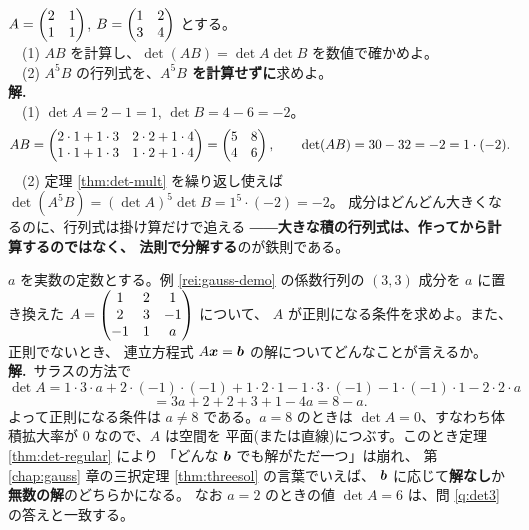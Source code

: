 \begin{rei}[例題・標準(積の法則の活用)]\label{rei:det-mult-ex}
$A = \begin{pmatrix}2 & 1 \\ 1 & 1\end{pmatrix}$, $B = \begin{pmatrix}1 & 2 \\ 3 & 4\end{pmatrix}$ とする。\\
　(1) $AB$ を計算し、$\det(AB) = \det A \det B$ を数値で確かめよ。\\
　(2) $A^5 B$ の行列式を、\textbf{$A^5 B$ を計算せずに}求めよ。\\
\textbf{解.}\\
　(1) $\det A = 2 - 1 = 1$, $\det B = 4 - 6 = -2$。
\[
AB = \begin{pmatrix}2 \cdot 1 + 1 \cdot 3 & 2 \cdot 2 + 1 \cdot 4 \\
1 \cdot 1 + 1 \cdot 3 & 1 \cdot 2 + 1 \cdot 4\end{pmatrix}
= \begin{pmatrix}5 & 8 \\ 4 & 6\end{pmatrix}, \qquad
\det(AB) = 30 - 32 = -2 = 1 \cdot (-2).
\]
　(2) 定理 \ref{thm:det-mult} を繰り返し使えば
$\det(A^5 B) = (\det A)^5 \det B = 1^5 \cdot (-2) = -2$。
成分はどんどん大きくなるのに、行列式は掛け算だけで追える
――\textbf{大きな積の行列式は、作ってから計算するのではなく、
法則で分解する}のが鉄則である。
\end{rei}

\begin{rei}[例題・標準(文字を含む行列)]\label{rei:det-case}
$a$ を実数の定数とする。例 \ref{rei:gauss-demo} の係数行列の
$(3,3)$ 成分を $a$ に置き換えた
$A = \begin{pmatrix}1 & 2 & 1 \\ 2 & 3 & -1 \\ -1 & 1 & a\end{pmatrix}$ について、
$A$ が正則になる条件を求めよ。また、正則でないとき、
連立方程式 $A\bm{x} = \bm{b}$ の解についてどんなことが言えるか。\\
\textbf{解.}\ サラスの方法で
\[
\det A = 1 \cdot 3 \cdot a + 2 \cdot (-1) \cdot (-1) + 1 \cdot 2 \cdot 1
- 1 \cdot 3 \cdot (-1) - 1 \cdot (-1) \cdot 1 - 2 \cdot 2 \cdot a
\]
\[
= 3a + 2 + 2 + 3 + 1 - 4a = 8 - a.
\]
よって正則になる条件は $a \neq 8$ である。$a = 8$ のときは
$\det A = 0$、すなわち体積拡大率が $0$ なので、$A$ は空間を
平面(または直線)につぶす。このとき定理 \ref{thm:det-regular} により
「どんな $\bm{b}$ でも解がただ一つ」は崩れ、
第 \ref{chap:gauss} 章の三択定理 \ref{thm:threesol} の言葉でいえば、
$\bm{b}$ に応じて\textbf{解なし}か\textbf{無数の解}のどちらかになる。
なお $a = 2$ のときの値 $\det A = 6$ は、問 \ref{q:det3} の答えと一致する。
\end{rei}

